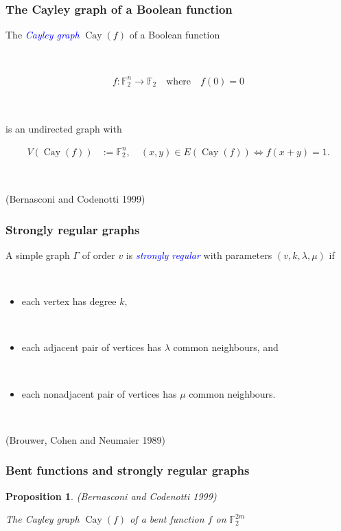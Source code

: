 \documentclass[pdf,sprung,slideColor,nocolorBG]{beamer}
\newenvironment{colortheme}[1]{
\def\ProvidesPackageRCS $##1${\relax}
\renewcommand{\ProcessOptions}{\relax}
\makeatletter

\makeatother
}{}
\newcommand{\slidecite}[1]{\tiny{(#1)}\normalsize{}}
\newcommand{\smallcite}[1]{\small{(#1)}\normalsize{}}
\newcommand{\mb}[1]{\mathbb{#1}}
\newcommand{\Emph}[1]{\emph{\textcolor{blue}{#1}}}
\newcommand{\To}{\rightarrow}
\newcommand{\Cay}[1]{\operatorname{Cay}\left(#1\right)}
\newcommand{\F}{\mb{F}}
\newtheorem{Proposition}{Proposition}
\begin{document}
\begin{colortheme}{seagull}

\begin{frame}
\frametitle{The Cayley graph of a Boolean function}
The \Emph{Cayley graph} $\Cay{f}$ of a Boolean function

~

\begin{align*}
%
f : \F_2^n \To \F_2 \quad \text{where} \quad f(0) = 0
%
\end{align*}

~

is
an undirected graph with

\begin{align*}
V(\Cay{f}) &:= \F_2^n, \quad (x,y) \in E(\Cay{f}) \Leftrightarrow f(x+y) = 1.
\end{align*}

~

\slidecite{Bernasconi and Codenotti 1999}
\end{frame}

\begin{frame}
\frametitle{Strongly regular graphs}
A simple graph $\Gamma$ of order $v$ is \Emph{strongly regular} with parameters
$(v,k,\lambda,\mu)$ if

~

\begin{itemize}
 \item
each vertex has degree $k,$

~
 \item
each adjacent pair of vertices has $\lambda$ common neighbours, and

~
\item
each nonadjacent pair of vertices has $\mu$ common neighbours.
\end{itemize}

~

\slidecite{Brouwer, Cohen and Neumaier 1989}

\end{frame}

\begin{frame}
\frametitle{Bent functions and strongly regular graphs}

\begin{Proposition}
\smallcite{Bernasconi and Codenotti 1999}

The Cayley graph $\Cay{f}$ of a bent function $f$ on $\F_2^{2m}$


\end{Proposition}
\end{frame}
\end{colortheme}
\end{document}
